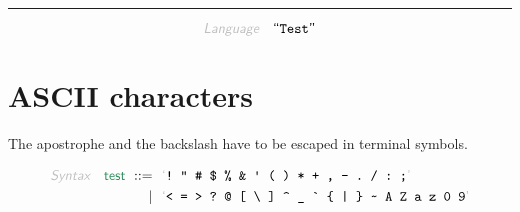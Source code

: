 

\renewcommand{\VARHYPER}[3]{\VAR{#3}}
\renewcommand{\NAMEHYPER}[3]{\NAME{#3}}
\renewcommand{\SYNHYPER}[3]{\SYN{#3}}
\renewcommand{\SEMHYPER}[3]{\SEM{#3}}
\renewcommand{\SECTHYPER}[3]{\SECT{#3}}
\begin{center}
\rule{3in}{0.4pt}
\end{center}

\begin{displaymath}
\KEY{Language} \quad \STRING{Test}
\end{displaymath}

\section{ASCII characters}\hypertarget{ascii-characters}{}\label{ascii-characters}

The apostrophe and the backslash have to be escaped in terminal symbols.

\begin{align*}
  \KEY{Syntax} \quad
     \SYN{test}
      \ ::= \ & \
      \LEX{{!}~{"}~{\HASH}~{\DOLLAR}~{\PERCENT}~{\AMPERSAND}~{\APOSTROPHE}~{(}~{)}~{*}~{+}~{,}~{-}~{.}~{/}~{:}~{;}} \\
      \ \mid \ & \ \LEX{{<}~{=}~{>}~{?}~{@}~{[}~{\BACKSLASH}~{]}~{\CARET}~{\UNDERSCORE}~{\GRAVE}~{\LEFTBRACE}~{|}~{\RIGHTBRACE}~{\TILDE}~A~Z~a~z~0~9}
\end{align*}
